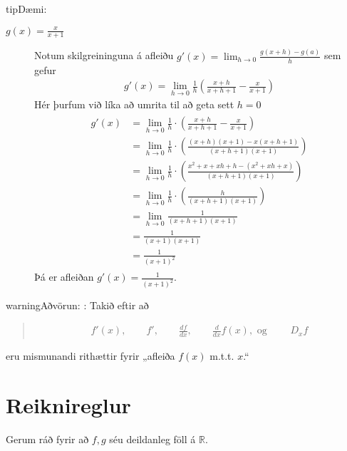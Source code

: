 \documentclass[a4paper,10pt,icelandic]{sphinxmanual}
\begin{document}
\begin{sphinxadmonition}{tip}{Dæmi:}
\begin{description}
\item[{ \(g(x) = \frac{x}{x+1}\)}] \leavevmode
Notum skilgreininguna á afleiðu \(g'(x) = \lim_{h\to 0}\frac{g(x+h)-g(a)}{h}\) sem gefur
\begin{equation*}
\begin{split}g'(x) = \lim_{h\to 0} \frac{1}{h} \left(\frac{x+h}{x+h+1} - \frac{x}{x+1}\right)\end{split}
\end{equation*}
Hér þurfum við líka að umrita til að geta sett \(h=0\)
\begin{equation*}
\begin{split}\begin{aligned}
g'(x) &= \lim_{h\to 0} \frac{1}{h} \cdot \left(\frac{x+h}{x+h+1} - \frac{x}{x+1}\right) \\
&= \lim_{h\to 0} \frac{1}{h} \cdot \left(\frac{(x+h)(x+1)- x(x+h+1)}{(x+h+1)(x+1)}\right) \\
&= \lim_{h\to 0} \frac{1}{h} \cdot \left(\frac{x^2 +x +xh+h -(x^2+xh+x)}{(x+h+1)(x+1)}\right) \\
&= \lim_{h\to 0} \frac{1}{h} \cdot \left(\frac{h}{(x+h+1)(x+1)}\right) \\
&= \lim_{h\to 0} \frac{1}{(x+h+1)(x+1)} \\
&= \frac{1}{(x+1)(x+1)}\\
&= \frac{1}{(x+1)^2}
\end{aligned}\end{split}
\end{equation*}
Þá er afleiðan \(g'(x)= \frac{1}{(x+1)^2}\).

\end{description}
\end{sphinxadmonition}

\begin{sphinxadmonition}{warning}{Aðvörun:}
:
Takið eftir að
\begin{quote}
\begin{equation*}
\begin{split}f'(x), \qquad f', \qquad \frac{df}{dx}, \qquad \frac{d}{dx} f(x), \text{ og } \qquad D_x f\end{split}
\end{equation*}\end{quote}

eru mismunandi rithættir fyrir „afleiða \(f(x)\) m.t.t. \(x\).“
\end{sphinxadmonition}


\section{Reiknireglur}
\label{\detokenize{Kafli11:reiknireglur}}
Gerum ráð fyrir að \(f,g\) séu deildanleg föll á \(\mathbb{R}\).
\end{document}
